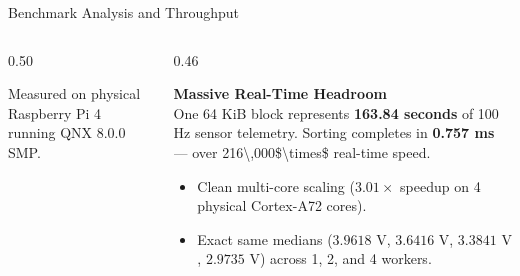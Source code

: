 \begin{frame}{Benchmark Analysis and Throughput}
  \begin{columns}[t, onlytextwidth]
    \begin{column}{0.50\textwidth}
      \begin{table}
        \centering
      \end{table}
      \vskip1mm
      {\scriptsize Measured on physical Raspberry Pi 4 running QNX 8.0.0 SMP.}
    \end{column}
    \begin{column}{0.46\textwidth}
      \begin{highlight}
        \textbf{Massive Real-Time Headroom} \\
        One 64 KiB block represents \textbf{163.84 seconds} of 100 Hz sensor telemetry. Sorting completes in \textbf{0.757 ms} — over \num{216\,000$\times$} real-time speed.
      \end{highlight}
      \vskip1.5mm
      \smalltext\compactitem
      \begin{itemize}
        \item Clean multi-core scaling ($3.01\times$ speedup on 4 physical Cortex-A72 cores).
        \item Exact same medians ($3.9618\text{ V}$, $3.6416\text{ V}$, $3.3841\text{ V}$, $2.9735\text{ V}$) across 1, 2, and 4 workers.
      \end{itemize}
    \end{column}
  \end{columns}
\end{frame}

